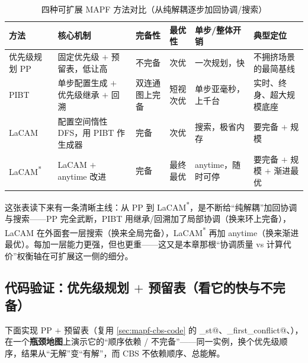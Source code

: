 \begin{table}[H]\centering\small
\caption{四种可扩展 MAPF 方法对比（从纯解耦逐步加回协调/搜索）}
\label{tab:mapf-scalable-compare}
\begin{tabularx}{\linewidth}{lLLlLL}
\toprule
方法 & 核心机制 & 完备性 & 最优性 & 单步/整体开销 & 典型定位 \\
\midrule
优先级规划 PP & 固定优先级 $+$ 预留表，低让高 & 不完备 & 次优 & 一次规划，快 & 不拥挤场景的最简基线 \\
PIBT & 单步配置生成 $+$ 优先级继承 $+$ 回溯 & 双连通图上完备 & 短视次优 & 单步亚毫秒，上千台 & 实时、终身、超大规模底座 \\
LaCAM & 配置空间惰性 DFS，用 PIBT 作生成器 & 完备 & 次优 & 搜索，极省内存 & 要完备 $+$ 规模 \\
LaCAM\textsuperscript{*} & LaCAM $+$ anytime 改进 & 完备 & 最终最优 & anytime，随时可停 & 要完备 $+$ 规模 $+$ 渐进最优 \\
\bottomrule
\end{tabularx}
\end{table}

这张表读下来有一条清晰主线：从 PP 到 LaCAM\textsuperscript{*}，是不断给“纯解耦”加回协调与搜索——PP 完全武断，PIBT 用继承/回溯加了局部协调（换来环上完备），LaCAM 在外面套一层搜索（换来全局完备），LaCAM\textsuperscript{*} 再加 anytime（换来渐进最优）。每加一层能力更强，但也更重——这又是本章那根“协调质量 vs 计算代价”权衡轴在可扩展这一侧的细分。

\subsection{代码验证：优先级规划 \texorpdfstring{$+$}{+} 预留表（看它的快与不完备）}
\label{sec:mapf-scalable-code}

下面实现 PP $+$ 预留表（复用 \cref{sec:mapf-cbs-code} 的 \verb@astar_st@、\verb@find_first_conflict@、\verb@soc@），在一个\textbf{瓶颈地图}上演示它的“顺序依赖 / 不完备”——同一实例，换个优先级顺序，结果从“无解”变“有解”，而 CBS 不依赖顺序、总能解。

